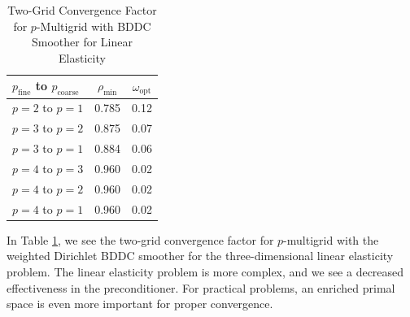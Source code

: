 \begin{table}[ht!]
\begin{center}
\begin{tabular}{l cc}
  \toprule
  $p_{\text{fine}}$ to $p_{\text{coarse}}$  & $\rho_{\min}$ & $\omega_{\text{opt}}$  \\
  \toprule
  $p = 2$ to $p = 1$   &  0.785 & 0.12  \\
  \midrule
  $p = 3$ to $p = 2$   &  0.875 & 0.07  \\
  $p = 3$ to $p = 1$   &  0.884 & 0.06  \\
  \midrule
  $p = 4$ to $p = 3$   &  0.960 & 0.02  \\
  $p = 4$ to $p = 2$   &  0.960 & 0.02  \\
  $p = 4$ to $p = 1$   &  0.960 & 0.02  \\
  \bottomrule
\end{tabular}
\end{center}
\caption{Two-Grid Convergence Factor for $p$-Multigrid with BDDC Smoother for Linear Elasticity}
\label{table:two_grid_bddc_smoother_3d_lin_elas}
\end{table}

In Table \ref{table:two_grid_bddc_smoother_3d_lin_elas}, we see the two-grid convergence factor for $p$-multigrid with the weighted Dirichlet BDDC smoother for the three-dimensional linear elasticity problem.
The linear elasticity problem is more complex, and we see a decreased effectiveness in the preconditioner.
For practical problems, an enriched primal space is even more important for proper convergence.